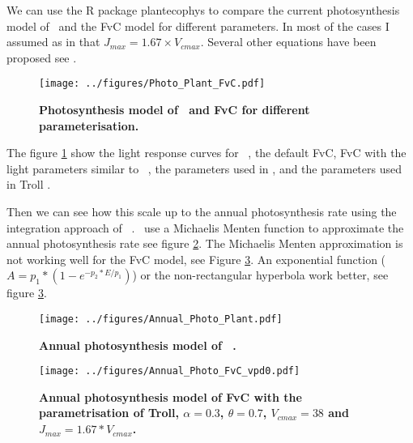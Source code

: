 \documentclass[a4paper,11pt]{article}
\begin{document}
\clearpage

We can use the R package plantecophys \citep{Duursma-2015} to compare
the current photosynthesis model of \plant\ and the FvC model for
different parameters. In most of the cases I assumed as in
\citet{Medlyn-2002} that $J_{max} = 1.67 \times V_{cmax}$. Several
other equations have been proposed see
\citet{Walker-2014,Kattge-2011}.


\begin{figure}[ht]
\centering
\texttt{[image: ../figures/Photo\_Plant\_FvC.pdf]}
\caption{\textbf{Photosynthesis model of \plant\ and FvC for different parameterisation.}
\label{fig:photo}}
\end{figure}

The figure \ref{fig:photo} show the light response curves for \plant\
, the default FvC, FvC with the light parameters similar to \plant\ , the parameters used in \citet{Sterck-2011}, and the parameters used in Troll \citep{Marechaux-2017}.

Then we can see how this scale up to the annual photosynthesis rate using the integration approach of \plant\ . \plant\ use a Michaelis Menten function to approximate the annual photosynthesis rate see figure \ref{fig:photo_annu_plant}. The Michaelis Menten approximation is not working well for the FvC model, see Figure \ref{fig:photo_annu_fvc}. An exponential function \citep{Chen-2016} ($A = p_1 *(1-e^{-p_2* E/p_1})$) or the non-rectangular hyperbola work better, see figure \ref{fig:photo_annu_fvc}.


\begin{figure}[ht]
\centering
\texttt{[image: ../figures/Annual\_Photo\_Plant.pdf]}
\caption{\textbf{Annual photosynthesis model of \plant\ .}
\label{fig:photo_annu_plant}}
\end{figure}


\begin{figure}[ht]
\centering
\texttt{[image: ../figures/Annual\_Photo\_FvC\_vpd0.pdf]}
\caption{\textbf{Annual photosynthesis model of FvC with the parametrisation of Troll, $\alpha = 0.3$, $\theta = 0.7$, $V_{cmax} = 38$ and $J_{max} = 1.67 * V_{cmax}$.}
\label{fig:photo_annu_fvc}}
\end{figure}

\clearpage
\end{document}
